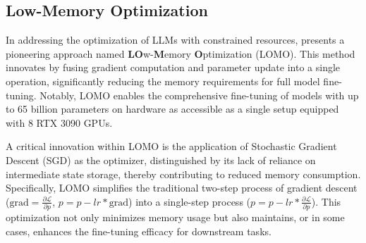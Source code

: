     \subsection{Low-Memory Optimization}

        In addressing the optimization of LLMs with constrained resources, \cite{lv2023parameter} presents a pioneering approach named \textbf{LO}w-\textbf{M}emory \textbf{O}ptimization (LOMO). This method innovates by fusing gradient computation and parameter update into a single operation, significantly reducing the memory requirements for full model fine-tuning. Notably, LOMO enables the comprehensive fine-tuning of models with up to 65 billion parameters on hardware as accessible as a single setup equipped with 8 RTX 3090 GPUs.

        A critical innovation within LOMO is the application of Stochastic Gradient Descent (SGD) as the optimizer, distinguished by its lack of reliance on intermediate state storage, thereby contributing to reduced memory consumption. Specifically, LOMO simplifies the traditional two-step process of gradient descent (\(\text{grad} = \frac{\partial \mathcal{L}}{\partial p}\), \(p = p - lr * \text{grad}\)) into a single-step process (\(p = p - lr * \frac{\partial \mathcal{L}}{\partial p}\)). This optimization not only minimizes memory usage but also maintains, or in some cases, enhances the fine-tuning efficacy for downstream tasks.

